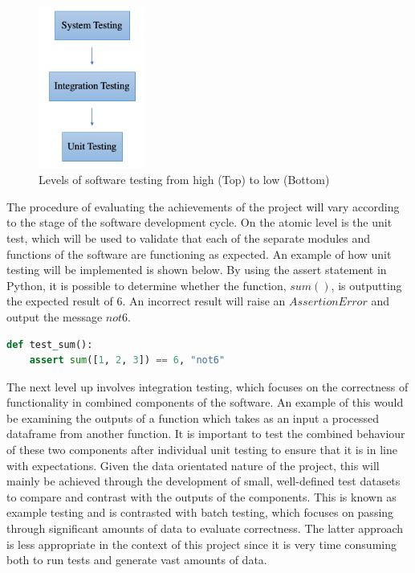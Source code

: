 \documentclass[10pt,onecolumn,letterpaper]{article}
\begin{document}
\begin{figure}[!hbt!]
\centering
\includegraphics[width=3.5cm]{evaluation.png}
\caption{Levels of software testing from high (Top) to low (Bottom)}
\end{figure}

The procedure of evaluating the achievements of the project will vary according to the stage of the software development cycle. On the atomic level is the unit test, which will be used to validate that each of the separate modules and functions of the software are functioning as expected. An example\cite{python_testing} of how unit testing will be implemented is shown below. By using the assert statement in Python, it is possible to determine whether the function, $sum()$, is outputting the expected result of $6$. An incorrect result will raise an $AssertionError$ and output the message $not6$.

\begin{lstlisting}[language=Python]
def test_sum():
    assert sum([1, 2, 3]) == 6, "not6"
\end{lstlisting} 

The next level up involves integration testing, which focuses on the correctness of functionality in combined components of the software. An example of this would be examining the outputs of a function which takes as an input a processed dataframe from another function. It is important to test the combined behaviour of these two components after individual unit testing to ensure that it is in line with expectations. Given the data orientated nature of the project, this will mainly be achieved through the development of small, well-defined test datasets to compare and contrast with the outputs of the components. This is known as example testing and is contrasted with batch testing, which focuses on passing through significant amounts of data to evaluate correctness. The latter approach is less appropriate in the context of this project since it is very time consuming both to run tests and generate vast amounts of data.
\end{document}
